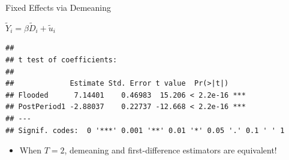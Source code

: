 \documentclass[ignorenonframetext,]{beamer}
\newenvironment{Shaded}{\begin{snugshade}}{\end{snugshade}}
\newcommand{\KeywordTok}[1]{\textcolor[rgb]{0.13,0.29,0.53}{\textbf{#1}}}
\newcommand{\DataTypeTok}[1]{\textcolor[rgb]{0.13,0.29,0.53}{#1}}
\newcommand{\StringTok}[1]{\textcolor[rgb]{0.31,0.60,0.02}{#1}}
\newcommand{\CommentTok}[1]{\textcolor[rgb]{0.56,0.35,0.01}{\textit{#1}}}
\newcommand{\OperatorTok}[1]{\textcolor[rgb]{0.81,0.36,0.00}{\textbf{#1}}}
\newcommand{\NormalTok}[1]{#1}
\providecommand{\tightlist}{%
  \setlength{\itemsep}{0pt}\setlength{\parskip}{0pt}}
\begin{document}
\begin{frame}[fragile]{Fixed Effects via Demeaning}

\(\tilde{Y}_{i} = \beta \tilde{D}_{i} + \tilde{u}_{i}\)

\small

\begin{Shaded}
\end{Shaded}

\begin{verbatim}
## 
## t test of coefficients:
## 
##             Estimate Std. Error t value  Pr(>|t|)    
## Flooded      7.14401    0.46983  15.206 < 2.2e-16 ***
## PostPeriod1 -2.88037    0.22737 -12.668 < 2.2e-16 ***
## ---
## Signif. codes:  0 '***' 0.001 '**' 0.01 '*' 0.05 '.' 0.1 ' ' 1
\end{verbatim}

\normalsize

\begin{itemize}[<+->]
\tightlist
\item
  When \(T = 2\), demeaning and first-difference estimators are
  equivalent!
\end{itemize}

\end{frame}
\end{document}
